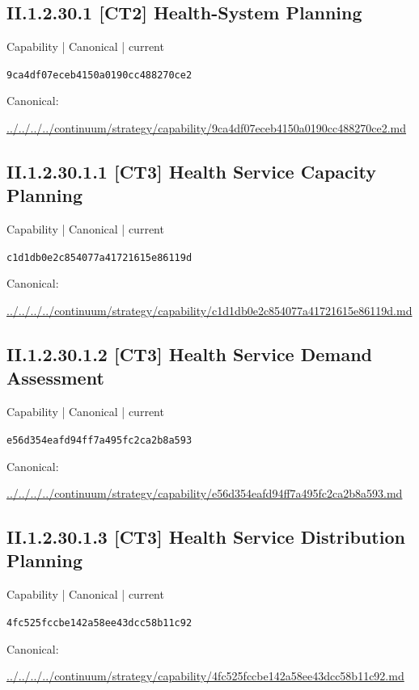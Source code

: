 \documentclass[10pt,a4paper]{article}
\begin{document}
\subsection*{II.1.2.30.1 [CT2] Health-System Planning}
{\small Capability | Canonical | current}\par
\texttt{9ca4df07eceb4150a0190cc488270ce2}\par
Canonical: \par
{\footnotesize\url{../../../../continuum/strategy/capability/9ca4df07eceb4150a0190cc488270ce2.md}}\par
\subsection*{II.1.2.30.1.1 [CT3] Health Service Capacity Planning}
{\small Capability | Canonical | current}\par
\texttt{c1d1db0e2c854077a41721615e86119d}\par
Canonical: \par
{\footnotesize\url{../../../../continuum/strategy/capability/c1d1db0e2c854077a41721615e86119d.md}}\par
\subsection*{II.1.2.30.1.2 [CT3] Health Service Demand Assessment}
{\small Capability | Canonical | current}\par
\texttt{e56d354eafd94ff7a495fc2ca2b8a593}\par
Canonical: \par
{\footnotesize\url{../../../../continuum/strategy/capability/e56d354eafd94ff7a495fc2ca2b8a593.md}}\par
\subsection*{II.1.2.30.1.3 [CT3] Health Service Distribution Planning}
{\small Capability | Canonical | current}\par
\texttt{4fc525fccbe142a58ee43dcc58b11c92}\par
Canonical: \par
{\footnotesize\url{../../../../continuum/strategy/capability/4fc525fccbe142a58ee43dcc58b11c92.md}}\par
\end{document}
